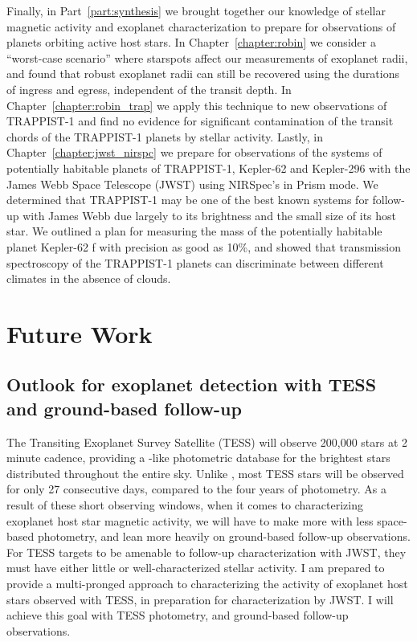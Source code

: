 Finally, in Part~\ref{part:synthesis} we brought together our knowledge of stellar magnetic activity and exoplanet characterization to prepare for observations of planets orbiting active host stars. In Chapter~\ref{chapter:robin} we consider a ``worst-case scenario'' where starspots affect our measurements of exoplanet radii, and found that robust exoplanet radii can still be recovered using the durations of ingress and egress, independent of the transit depth. In Chapter~\ref{chapter:robin_trap} we apply this technique to new \spitzer observations of TRAPPIST-1 and find no evidence for significant contamination of the transit chords of the TRAPPIST-1 planets by stellar activity. Lastly, in Chapter~\ref{chapter:jwst_nirspc} we prepare for observations of the systems of potentially habitable planets of TRAPPIST-1, Kepler-62 and Kepler-296 with the James Webb Space Telescope (JWST) using NIRSpec's in Prism mode. We determined that TRAPPIST-1 may be one of the best known systems for follow-up with James Webb due largely to its brightness and the small size of its host star. We outlined a plan for measuring the mass of the potentially habitable planet Kepler-62 f with precision as good as 10\%, and showed that transmission spectroscopy of the TRAPPIST-1 planets can discriminate between different climates in the absence of clouds. 

\section{Future Work}

\subsection{Outlook for exoplanet detection with TESS and ground-based follow-up}

The Transiting Exoplanet Survey Satellite (TESS) will observe 200,000 stars at 2 minute cadence, providing a \kepler-like photometric database for the brightest stars distributed throughout the entire sky. Unlike \kepler, most TESS stars will be observed for only 27 consecutive days, compared to the four years of \kepler photometry. As a result of these short observing windows, when it comes to characterizing exoplanet host star magnetic activity, we will have to make more with less space-based photometry, and lean more heavily on ground-based follow-up observations. For TESS targets to be amenable to follow-up characterization with JWST, they must have either little or well-characterized stellar activity. I am prepared to provide a multi-pronged approach to characterizing the activity of exoplanet host stars observed with TESS, in preparation for characterization by JWST. I will achieve this goal with TESS photometry, and ground-based follow-up observations.

